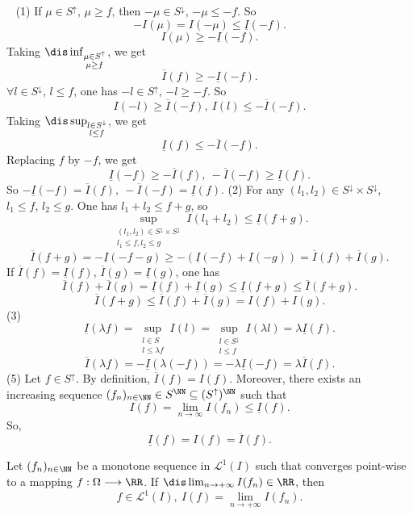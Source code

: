 \begin{proofenv}
    \ \newline
    (1) If $\mu\in S^{\uparrow}$, $\mu \ge f$, then $-\mu\in S^{\downarrow}$, $-\mu\le -f$. So
    $$-I(\mu)=I(-\mu)\le \underline{I}(-f).$$
    $$ I(\mu)\ge -\underline{I}(-f).$$
    Taking $\dis \inf_{\substack{\mu\in S^{\uparrow}\\\mu\ge f}}$, we get 
    $$ \overline{I}(f)\ge -\underline{I}(-f).$$
    $\forall l\in S^{\downarrow}$, $l\le f$, one has $-l\in S^{\uparrow}$, $-l\ge -f$. So 
    $$ I(-l)\ge \overline{I}(-f),\  I(l)\le -\overline{I}(-f).$$
    Taking $\dis \sup_{\substack{l\in S^{\downarrow}\\l \le f}}$, we get 
    $$ \underline{I}(f)\le -\overline{I}(-f).$$
    Replacing $f$ by $-f$, we get
    $$ \underline{I}(-f)\ge -\overline{I}(f),\ -\overline{I}(-f)\ge\underline{I}(f).$$
    So $-\underline{I}(-f)=\overline{I}(f),\ -\overline{I}(-f)=\underline{I}(f)$.
    \newline
    (2) For any $(l_1,l_2)\in S^{\downarrow}\times S^{\downarrow}$, $l_1\le f$, $l_2\le g$. One has $l_1+l_2\le f+g$, so
    $$ \sup_{\substack{(l_1,l_2)\in S^{\downarrow}\times S^{\downarrow}\\ l_1\le f,l_2\le g}} I(l_1+l_2)\le \underline{I}(f+g).$$
    $$ \overline{I} (f+g)=-\underline{I}(-f-g)\ge -(\underline{I}(-f)+\underline{I}(-g))=\overline{I}(f)+\overline{I}(g).$$
    If $\overline{I}(f)=\underline{I}(f)$, $\overline{I}(g)=\underline{I}(g)$, one has
    $$\overline{I}(f)+\overline{I}(g)=\underline{I}(f)+\underline{I}(g)\le \underline{I}(f+g)\le \overline{I}(f+g).$$
    $$ \overline{I}(f+g)\le \overline{I}(f)+\overline{I}(g)=I(f)+I(g).$$
    (3) $$ \underline{ I}(\lambda f)=\sup_{\substack{l\in S\\ l\le \lambda f}}I(l)=\sup_{\substack{l\in S^{\downarrow}\\ l\le f}}I(\lambda l)=\lambda \underline{I}(f).$$
    $$ \overline{I}(\lambda f)=-\underline{I}(\lambda(-f))=-\lambda \underline{I}(-f)=\lambda \overline{I}(f).$$
    (5) Let $f\in S^{\uparrow}$. By definition, $\overline{I}(f)=I(f)$. Moreover, there exists an increasing sequence $(f_n)_{n\in\NN}\in S^{\NN}\subseteq (S^{\uparrow})^{\NN}$ such that
    $$ I(f)=\lim_{n\rightarrow \infty} I(f_n)\le \underline{I}(f).$$
    So, 
    $$ \underline{I}(f)= I(f)= \overline{I}(f).$$
\end{proofenv}
\begin{theoremenv}
    Let $(f_n)_{n\in\NN}$ be a monotone sequence in $\mathcal{L}^1(I)$ such that converges point-wise to a mapping $f:\Omega\longrightarrow \RR$. If $\dis \lim_{n\rightarrow +\infty} I(f_n)\in\RR$, then
    $$ f\in \mathcal{L}^1(I),\  I(f)=\lim_{n\rightarrow +\infty} I(f_n).$$
\end{theoremenv}
